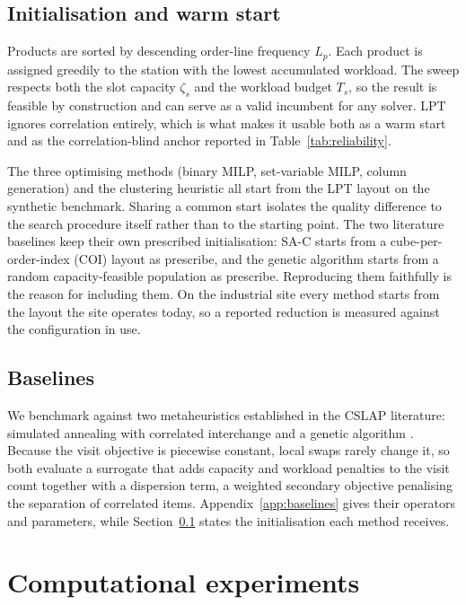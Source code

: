 \documentclass[]{interact}
\begin{document}
\subsection{Initialisation and warm start}\label{sec:init}
Products are sorted by descending order-line frequency $L_p$. Each product is assigned greedily to the station with the lowest accumulated workload. The sweep respects both the slot capacity $\zeta_s$ and the workload budget $T_s$, so the result is feasible by construction and can serve as a valid incumbent for any solver. LPT ignores correlation entirely, which is what makes it usable both as a warm start and as the correlation-blind anchor reported in Table~\ref{tab:reliability}.

The three optimising methods (binary MILP, set-variable MILP, column generation) and the clustering heuristic all start from the LPT layout on the synthetic benchmark. Sharing a common start isolates the quality difference to the search procedure itself rather than to the starting point. The two literature baselines keep their own prescribed initialisation: SA-C starts from a cube-per-order-index (COI) layout as \citet{kim2012} prescribe, and the genetic algorithm starts from a random capacity-feasible population as \citet{pan2015} prescribe. Reproducing them faithfully is the reason for including them. On the industrial site every method starts from the layout the site operates today, so a reported reduction is measured against the configuration in use.

\subsection{Baselines}\label{sec:baselines}
We benchmark against two metaheuristics established in the CSLAP literature: simulated annealing with correlated interchange \citep{kim2012, zhang2019cie} and a genetic algorithm \citep{pan2015}. Because the visit objective is piecewise constant, local swaps rarely change it, so both evaluate a surrogate that adds capacity and workload penalties to the visit count together with a dispersion term, a weighted secondary objective penalising the separation of correlated items. Appendix~\ref{app:baselines} gives their operators and parameters, while Section~\ref{sec:init} states the initialisation each method receives.

\section{Computational experiments}\label{sec:experiments}
\end{document}
